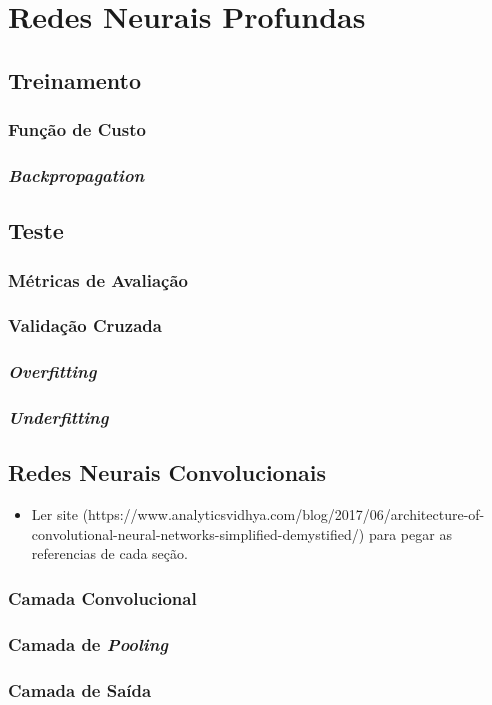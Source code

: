 \newpage
\section{Redes Neurais Profundas}


\subsection{Treinamento}
\subsubsection{Função de Custo}


\subsubsection{\textit{Backpropagation}}


\subsection{Teste}
\subsubsection{Métricas de Avaliação}


\subsubsection{Validação Cruzada}


\subsubsection{\textit{Overfitting}}


\subsubsection{\textit{Underfitting}}


\subsection{Redes Neurais Convolucionais}
\label{deep:CNN}
\begin{itemize}
    \item Ler site (https://www.analyticsvidhya.com/blog/2017/06/architecture-of-convolutional-neural-networks-simplified-demystified/) para pegar as referencias de cada seção.
\end{itemize}
\subsubsection{Camada Convolucional}


\subsubsection{Camada de \textit{Pooling}}


\subsubsection{Camada de Saída}